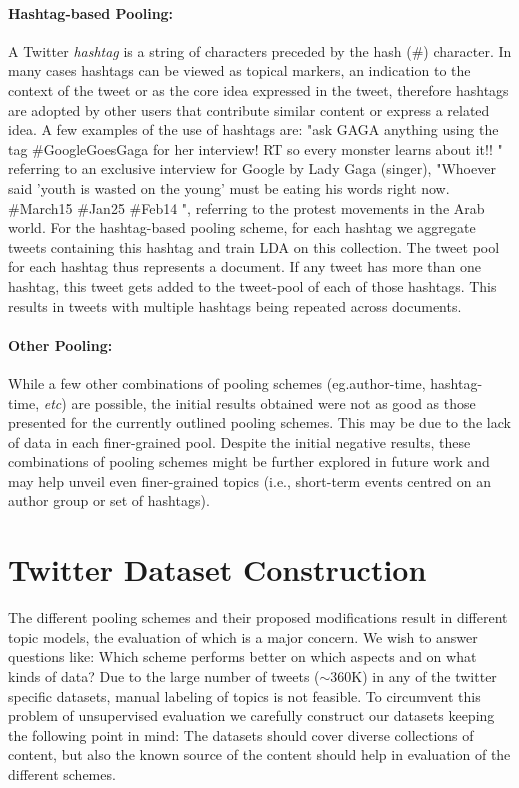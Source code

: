 \documentclass{sig-alternate}
\begin{document}
\paragraph{Hashtag-based Pooling:}

A Twitter \textit{hashtag} is a string of characters preceded by the
hash (\#) character. In many cases hashtags can be viewed as topical
markers, an indication to the context of the tweet or as the core idea
expressed in the tweet, therefore hashtags are adopted by other users
that contribute similar content or express a related idea. A few
examples of the use of hashtags are: "ask GAGA anything using the tag
\#GoogleGoesGaga for her interview! RT so every monster learns about
it!! " referring to an exclusive interview for Google by Lady Gaga
(singer), "Whoever said 'youth is wasted on the young' must be eating
his words right now. \#March15 \#Jan25 \#Feb14 ", referring to the
protest movements in the Arab world.  For the hashtag-based pooling
scheme, for each hashtag we aggregate tweets containing this hashtag
and train LDA on this collection.  The tweet pool for each hashtag
thus represents a document. If any tweet has more than one hashtag,
this tweet gets added to the tweet-pool of each of those
hashtags. This results in tweets with multiple hashtags being repeated
across documents.

\paragraph{Other Pooling:}

While a few other combinations of pooling schemes (eg.author-time,
hashtag-time, \textit{etc}) are possible, the initial results obtained
were not as good as those presented for the currently outlined
pooling schemes.  This may be due to the lack of data in each
finer-grained pool.  Despite the initial negative results, these 
combinations of pooling schemes might be further explored in future 
work and may help unveil even finer-grained topics (i.e., short-term 
events centred on an author group or set of hashtags).


\section{Twitter Dataset Construction}

\label{sec:dataset}

The different pooling schemes and their proposed modifications result
in different topic models, the evaluation of which is a major
concern. We wish to answer questions like: Which scheme performs
better on which aspects and on what kinds of data? Due to the large
number of tweets ($\sim$360K) in any of the twitter specific datasets,
manual labeling of topics is not feasible.  To circumvent this
problem of unsupervised evaluation we carefully construct our datasets
keeping the following point in mind: The datasets should cover diverse
collections of content, but also the known source of the content
should help in evaluation of the different schemes.
\end{document}
